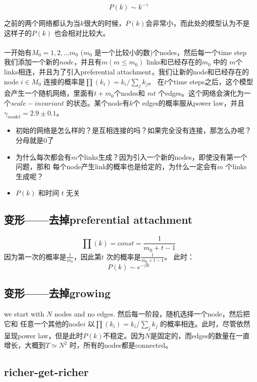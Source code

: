 \documentclass[a4paper]{article}
\begin{document}
\paragraph{}

\[P(k)\sim k^{-\gamma}\]

之前的两个网络都认为当$k$很大的时候，$P(k)$会非常小，而此处的模型认为不是
这样子的$P(k)$ 也会相对比较大。
\paragraph{}
一开始有$M_0={1,2,...m_0}$ ($m_0$ 是一个比较小的数)个nodes，然后每一个time step
我们添加一个新的$node$，并且有$m(m\leq m_0)$ links和已经存在的$m_0$ 中的
$m$个links相连，并且为了引入preferential attachment，我们让新的node和已经存在的 node $i\in M_0$ 连接的概率是$\prod(k_i)= k_i/{\sum_{j} k_j}$。
在$t$个time steps之后，这个模型会产生一个随机网络，里面有$t+m_0$个nodes和
$mt$ 个edges。这个网络会演化为一个$scale-invariant$ 的状态。某个node有$k$个
edges的概率服从power law，并且$\gamma_{model}=2.9 \pm 0.1$。
\begin{itemize}
	\item 初始的网络是怎么样的？是互相连接的吗？如果完全没有连接，那怎么办呢？分母就是0了
	\item 为什么每次都会有$m$个links生成？因为引入一个新的nodes，即使没有第一个问题，那和
	每个node产生link的概率也是给定的，为什么一定会有$m$ 个links生成呢？
	\item $P(k)$ 和时间 $t$ 无关
\end{itemize}
\subsection{变形——去掉preferential attachment}
\[\prod (k)=const=\frac{1}{m_0+t-1}\]
因为第一次的概率是$\frac{1}{m_0}$，因此第$t$ 次的概率是$\frac{1}{m_0+t-1}$。
此时：
\[  P(k)\sim e^{-\beta k} \]
\subsection{变形——去掉growing}
we start with $N$ nodes and no edges. 然后每一阶段，随机选择一个node，然后把它和
任意一个其他的node$i$ 以$\prod (k_i)=k_i/\sum_{j}k_j$ 的概率相连。此时，尽管依然呈现power law，但是此时$P(k)$不稳定。因为$N$是固定的，而edges的数量在一直增长，大概到$T \simeq N^2$ 时，所有的nodes都是connected。
\subsection{richer-get-richer}
\end{document}
